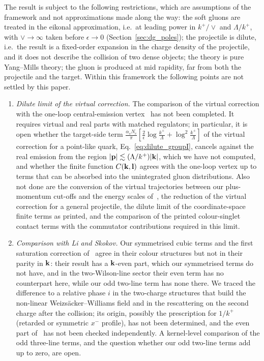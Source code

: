 The result is subject to the following restrictions, which are assumptions of the framework and not approximations made along the way: the soft gluons are treated in the eikonal approximation, i.e.\ at leading power in $k^+/\vee$ and $\Lambda/k^+$, with $\vee\to\infty$ taken before $\epsilon\to0$ (Section~\ref{sec:dg_poles}); the projectile is dilute, i.e.\ the result is a fixed-order expansion in the charge density of the projectile, and it does not describe the collision of two dense objects; the theory is pure Yang--Mills theory; the gluon is produced at mid rapidity, far from both the projectile and the target. Within this framework the following points are not settled by this paper.
\begin{enumerate}
\item[(i)] \emph{Dilute limit of the virtual correction.} The comparison of the virtual correction with the one-loop central-emission vertex~\cite{Fadin:1998py,DelDuca:1998cx,Bartels:2006hg} has not been completed. It requires virtual and real parts with matched regulators; in particular, it is open whether the target-side term $\frac{\alpha_sN_c}{\pi}[\frac2\epsilon\log\frac{k^+}{\Lambda}+\log^2\frac{k^+}{\Lambda}]$ of the virtual correction for a point-like quark, Eq.~\eqref{eq:dilute_groupI}, cancels against the real emission from the region $|\mathbf{p}|\lesssim(\Lambda/k^+)|\mathbf{k}|$, which we have not computed, and whether the finite function $C(\mathbf{k},\mathbf{l})$ agrees with the one-loop vertex up to terms that can be absorbed into the unintegrated gluon distributions. Also not done are the conversion of the virtual trajectories between our plus-momentum cut-offs and the energy scales of~\cite{Bartels:2006hg}, the reduction of the virtual correction for a general projectile, the dilute limit of the coordinate-space finite terms as printed, and the comparison of the printed colour-singlet contact terms with the commutator contributions required in this limit.
\item[(ii)] \emph{Comparison with Li and Skokov.} Our symmetrised cubic terms and the first saturation correction of~\cite{Li:2021ntm} agree in their colour structures but not in their parity in $\mathbf{k}$: their result has a $\mathbf{k}$-even part, which our symmetrised terms do not have, and in the two-Wilson-line sector their even term has no counterpart here, while our odd two-line term has none there. We traced the difference to a relative phase $i$ in the two-charge structures that build the non-linear Weizs\"acker--Williams field and in the rescattering on the second charge after the collision; its origin, possibly the prescription for $1/k^+$ (retarded or symmetric $x^-$ profile), has not been determined, and the even part of~\cite{Li:2021ntm} has not been checked independently. A kernel-level comparison of the odd three-line terms, and the question whether our odd two-line terms add up to zero, are open.

\end{enumerate}
